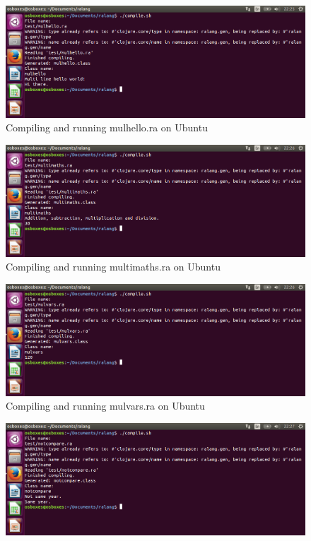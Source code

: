 \documentclass[a4paper]{article}
\begin{document}
\begin{appendices}
\begin{figure}[h!]
		\includegraphics[width=\linewidth]{images/ubuntu_mulhello.png}
		\caption[Compiling and running mulhello.ra on Ubuntu 15.10 64-bit]{Compiling and running mulhello.ra on Ubuntu}
		\label{fig:ubuntu_mulhello}
	\end{figure}
	\begin{figure}[h!]
		\centering
		\includegraphics[width=\linewidth]{images/ubuntu_multimaths.png}
		\caption[Compiling and running multimaths.ra on Ubuntu 15.10 64-bit]{Compiling and running multimaths.ra on Ubuntu}
		\label{fig:ubuntu_multimaths}
	\end{figure}
	\begin{figure}[h!]
		\centering
		\includegraphics[width=\linewidth]{images/ubuntu_mulvars.png}
		\caption[Compiling and running mulvars.ra on Ubuntu 15.10 64-bit]{Compiling and running mulvars.ra on Ubuntu}
		\label{fig:ubuntu_mulvars}
	\end{figure}
	\newpage
	\begin{figure}[h!]
		\centering
		\includegraphics[width=\linewidth]{images/ubuntu_notcompare.png}

\end{figure}
\end{appendices}
\end{document}
